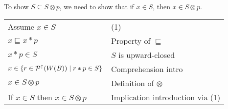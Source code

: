 To show $S \subseteq S \otimes p$, we need to show that if $x \in S$, then $x \in S \otimes p$. 
\\

\begin{tabular}{ll}
Assume $x \in S$                      & (1) \\
$x \sqsubseteq x * p$                 & Property of $\sqsubseteq$ \\
$x * p \in S$                         & $S$ is upward-closed \\
$x \in \{ r \in \mathcal{P}^{\uparrow}({W(B)}) \;|\; r * p \in S \}$ & Comprehension intro \\
$x \in S \otimes p$                   & Definition of $\otimes$ \\ 
If $x \in S$ then $x \in S \otimes p$ & Implication introduction via (1) \\ 
\end{tabular}
\\


